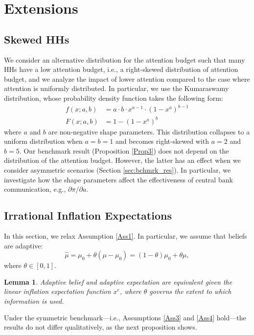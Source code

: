 \documentclass[12pt,a4paper]{article}
\newtheorem{lemma}{Lemma}
\begin{document}
\section{Extensions}

\subsection{Skewed HHs}
We consider an alternative distribution for the attention budget such that many HHs have a low attention budget, i.e., a right-skewed distribution of attention budget, and we analyze the impact of lower attention compared to the case where attention is uniformly distributed. In particular, we use the Kumaraswamy distribution, whose probability density function takes the following form:
\begin{align}
    f(x;a,b) & = a \cdot b \cdot x^{a-1} \cdot (1-x^a)^{b-1} \\
    F(x;a,b) & = 1 - (1-x^a)^b 
\end{align}
where $a$ and $b$ are non-negative shape parameters. This distribution collapses to a uniform distribution when $a=b=1$ and becomes right-skewed with $a=2$ and $b=5$. Our benchmark result (Proposition \ref{Prop3}) does not depend on the distribution of the attention budget. However, the latter has an effect when we consider asymmetric scenarios (Section \ref{sec:bchmrk_res}). In particular, we investigate how the shape parameters affect the effectiveness of central bank communication, e.g., $\partial \pi/ \partial a$.

\subsection{Irrational Inflation Expectations}
In this section, we relax Assumption \ref{Ass1}. In particular, we assume that beliefs are adaptive: 
$$\hat{\mu} = \mu_0 + \theta (\mu-\mu_0) = (1-\theta)\mu_0 + \theta \mu,$$
where $\theta\in[0,1]$.
\begin{lemma}
\label{adaptive}
    Adaptive belief and adaptive expectation are equivalent given the linear inflation expectation function $x^e$, where $\theta$ governs the extent to which information is used.
\end{lemma}

Under the symmetric benchmark---i.e., Assumptions \ref{Ass3} and \ref{Ass4} hold---the results do not differ qualitatively, as the next proposition shows.
\end{document}
